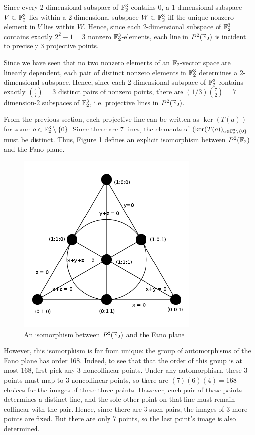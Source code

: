 \documentclass{article}
\begin{document}
Since every 2-dimensional subspace of $\mathbb{F}_2^3$ contains 0, a 1-dimensional subspace $V \subset \mathbb{F}_2^3$ lies within a 2-dimensional subspace $W \subset \mathbb{F}_2^3$ iff the unique nonzero element in $V$ lies within $W$. Hence, since each 2-dimensional subspace of $\mathbb{F}_2^3$ contains exactly $2^2 - 1 = 3$ nonzero $\mathbb{F}_2^3$-elements, each line in $P^2(\mathbb{F}_2)$ is incident to precisely 3 projective points.

Since we have seen that no two nonzero elements of an $\mathbb{F}_2$-vector space are linearly dependent, each pair of distinct nonzero elements in $\mathbb{F}_2^3$ determines a 2-dimensional subspace. Hence, since each 2-dimensional subspace of $\mathbb{F}_2^3$ contains exactly ${3 \choose 2} = 3$ distinct pairs of nonzero points, there are
$(1/3) {7 \choose 2} = 7$ dimension-2 subspaces of $\mathbb{F}_2^3$, i.e. projective lines in $P^2(\mathbb{F}_2)$.

From the previous section, each projective line can be written as $\ker(T(a))$ for some $a \in \mathbb{F}_2^3 \setminus\{0\}$.  Since there are 7 lines, the elements of $(\ker(T(a))_{a \in \mathbb{F}_2^3 \setminus\{0\}}$ must be distinct.  Thus, Figure \ref{fano} defines an explicit isomorphism between $P^2(\mathbb{F}_2)$ and the Fano plane.


\begin{figure}[h]
\centering
\includegraphics[width=3.5in]{Fano_plane.png}
\caption{An isomorphism between $P^2(\mathbb{F}_2)$ and the Fano plane}
\label{fano}
\end{figure}

However, this isomorphism is far from unique: the group of automorphisms of the Fano plane has order 168. Indeed, to see that that the order of this group is at most 168, first pick any 3 noncollinear points.  Under any automorphism, these 3 points must map to 3 noncollinear points, so there are $(7)(6)(4) = 168$ choices for the images of these three points. However, each pair of these points determines a distinct line, and the sole other point on that line must remain collinear with the pair.  Hence, since there are 3 such pairs, the images of 3 more points are fixed.  But there are only 7 points, so the last point's image is also determined.
\end{document}
